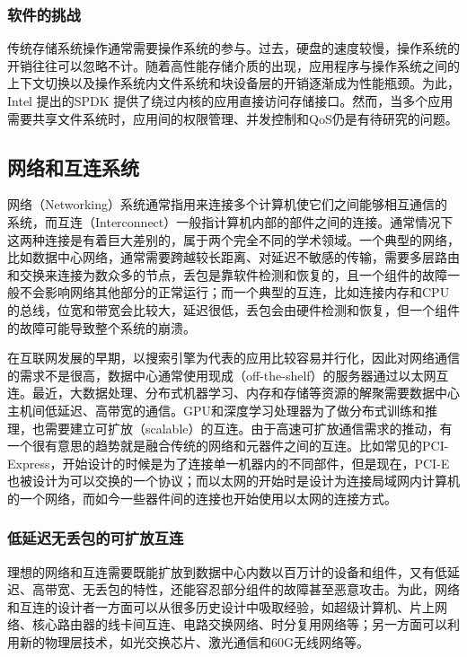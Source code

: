 \subsubsection{软件的挑战}

传统存储系统操作通常需要操作系统的参与。过去，硬盘的速度较慢，操作系统的开销往往可以忽略不计。随着高性能存储介质的出现，应用程序与操作系统之间的上下文切换以及操作系统内文件系统和块设备层的开销逐渐成为性能瓶颈。为此，Intel 提出的SPDK \cite{spdk} 提供了绕过内核的应用直接访问存储接口。然而，当多个应用需要共享文件系统时，应用间的权限管理、并发控制和QoS仍是有待研究的问题。

\subsection{网络和互连系统}

网络（Networking）系统通常指用来连接多个计算机使它们之间能够相互通信的系统，而互连（Interconnect）一般指计算机内部的部件之间的连接。通常情况下这两种连接是有着巨大差别的，属于两个完全不同的学术领域。一个典型的网络，比如数据中心网络，通常需要跨越较长距离、对延迟不敏感的传输，需要多层路由和交换来连接为数众多的节点，丢包是靠软件检测和恢复的，且一个组件的故障一般不会影响网络其他部分的正常运行；而一个典型的互连，比如连接内存和CPU的总线，位宽和带宽会比较大，延迟很低，丢包会由硬件检测和恢复，但一个组件的故障可能导致整个系统的崩溃。

在互联网发展的早期，以搜索引擎为代表的应用比较容易并行化，因此对网络通信的需求不是很高，数据中心通常使用现成（off-the-shelf）的服务器通过以太网互连。最近，大数据处理、分布式机器学习、内存和存储等资源的解聚需要数据中心主机间低延迟、高带宽的通信。GPU和深度学习处理器为了做分布式训练和推理，也需要建立可扩放（scalable）的互连。由于高速可扩放通信需求的推动，有一个很有意思的趋势就是融合传统的网络和元器件之间的互连。比如常见的PCI-Express，开始设计的时候是为了连接单一机器内的不同部件，但是现在，PCI-E也被设计为可以交换的一个协议；而以太网的开始时是设计为连接局域网内计算机的一个网络，而如今一些器件间的连接也开始使用以太网的连接方式。

\subsubsection{低延迟无丢包的可扩放互连}

理想的网络和互连需要既能扩放到数据中心内数以百万计的设备和组件，又有低延迟、高带宽、无丢包的特性，还能容忍部分组件的故障甚至恶意攻击。为此，网络和互连的设计者一方面可以从很多历史设计中吸取经验，如超级计算机、片上网络、核心路由器的线卡间互连、电路交换网络、时分复用网络等；另一方面可以利用新的物理层技术，如光交换芯片、激光通信和60G无线网络等。

